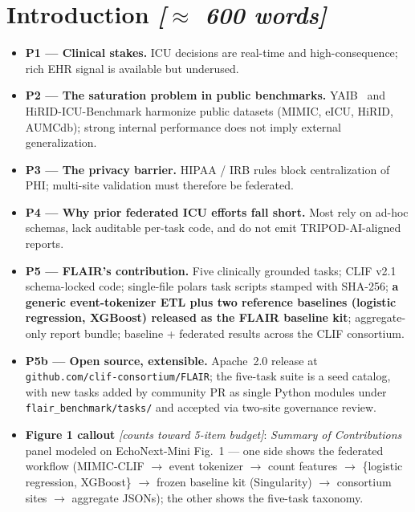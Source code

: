 \documentclass[11pt]{article}
\newcommand{\note}[1]{{\color{notecolor}\textit{[#1]}}}
\begin{document}
\section{Introduction \note{$\approx$ 600 words}}
\begin{itemize}[leftmargin=1.5em]
  \item \textbf{P1 --- Clinical stakes.} ICU decisions are real-time and
        high-consequence; rich EHR signal is available but underused.
  \item \textbf{P2 --- The saturation problem in public benchmarks.}
        YAIB~\citep{vandewater2023yaib} and HiRID-ICU-Benchmark
        \citep{yeche2021hirid} harmonize public datasets (MIMIC, eICU,
        HiRID, AUMCdb); strong internal performance does not imply
        external generalization.
  \item \textbf{P3 --- The privacy barrier.} HIPAA / IRB rules block
        centralization of PHI; multi-site validation must therefore be
        federated.
  \item \textbf{P4 --- Why prior federated ICU efforts fall short.} Most
        rely on ad-hoc schemas, lack auditable per-task code, and do not
        emit TRIPOD-AI-aligned reports.
  \item \textbf{P5 --- FLAIR's contribution.} Five clinically grounded
        tasks; CLIF v2.1 schema-locked code; single-file polars task
        scripts stamped with SHA-256; \textbf{a generic event-tokenizer
        ETL plus two reference baselines (logistic regression, XGBoost)
        released as the FLAIR baseline kit}; aggregate-only report
        bundle; baseline + federated results across the CLIF consortium.
  \item \textbf{P5b --- Open source, extensible.} Apache~2.0 release at
        \texttt{github.com/clif-consortium/FLAIR}; the five-task suite
        is a seed catalog, with new tasks added by community PR as
        single Python modules under \texttt{flair\_benchmark/tasks/}
        and accepted via two-site governance review.
  \item \textbf{Figure 1 callout} \note{counts toward 5-item budget}:
        \emph{Summary of Contributions} panel modeled on EchoNext-Mini
        Fig.\ 1 \citep{hughes2026echonextmini} --- one side shows the
        federated workflow (MIMIC-CLIF $\to$ event tokenizer $\to$
        count features $\to$ \{logistic regression, XGBoost\} $\to$
        frozen baseline kit (Singularity) $\to$ consortium sites $\to$
        aggregate JSONs); the other shows the five-task taxonomy.
\end{itemize}
\end{document}
